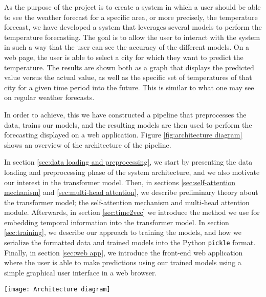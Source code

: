 As the purpose of the project is to create a system in which a user should be able to see the weather forecast for a specific area, or more precisely, the temperature forecast, we have developed a system that leverages several models to perform the temperature forecasting. 
The goal is to allow the user to interact with the system in such a way that the user can see the accuracy of the different models. 
On a web page, the user is able to select a city for which they want to predict the temperature. The results are shown both as a graph that displays the predicted value versus the actual value, as well as the specific set of temperatures of that city for a given time period into the future. This is similar to what one may see on regular weather forecasts.

In order to achieve, this we have constructed a pipeline that preprocesses the data, trains our models, and the resulting models are then used to perform the forecasting displayed on a web application. 
Figure \ref{fig:architecture diagram} shows an overview of the architecture of the pipeline.

In section \ref{sec:data loading and preprocessing}, we start by presenting the data loading and preprocessing phase of the system architecture, and we also motivate our interest in the transformer model.
Then, in sections \ref{sec:self-attention mechanism} and \ref{sec:multi-head attention}, we describe preliminary theory about the transformer model; the self-attention mechanism and multi-head attention module. 
Afterwards, in section \ref{sec:time2vec} we introduce the method we use for embedding temporal information into the transformer model. 
In section \ref{sec:training}, we describe our approach to training the models, and how we serialize the formatted data and trained models into the Python \texttt{pickle} format.
Finally, in section \ref{sec:web app}, we introduce the front-end web application where the user is able to make predictions using our trained models using a simple graphical user interface in a web browser.

\begin{figure*}
	\centering
	\texttt{[image: Architecture diagram]}
	\caption{The architecture of the system pipeline.}
	\label{fig:architecture diagram}
\end{figure*}